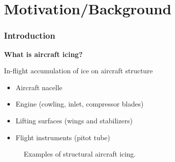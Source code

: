 \documentclass[9pt]{beamer}
\begin{document}
\section{Motivation/Background}
\label{sec-1}
\begin{frame}
\frametitle{Introduction}
\label{sec-1-1}

\textbf{What is aircraft icing?}

In-flight accumulation of ice on aircraft structure
\begin{itemize}
\item Aircraft nacelle
\item Engine (cowling, inlet, compressor blades)
\item Lifting surfaces (wings and stabilizers)
\item Flight instruments (pitot tube)
\end{itemize}

\vspace*{-0.0cm}\begin{figure}
      \caption{Examples of structural aircraft icing.}
\end{figure}
\end{frame}
\end{document}
